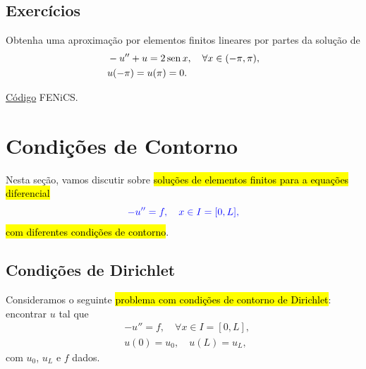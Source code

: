 \subsection{Exercícios}

\begin{exer}\label{exer:dc}
  Obtenha uma aproximação por elementos finitos lineares por partes da solução de
  \begin{align}
    &-u'' + u = 2\operatorname{sen} x,\quad \forall x\in (-\pi, \pi),\\
    &u(-\pi)=u(\pi)=0.
  \end{align}
\end{exer}
\begin{resp}
  \ifispython
  \href{https://github.com/phkonzen/notas/blob/master/src/MetodoElementosFinitos/cap_mef1d/dados/exer_dc/exer_dc.py}{Código} FENiCS.
  \fi
\end{resp}


\section{Condições de Contorno}\label{cap_mef1d_sec_cc}

Nesta seção, vamos discutir sobre \hl{soluções de elementos finitos para a equações diferencial}
\begin{equation}\color{blue}-u'' = f,\quad x\in I=[0, L],
\end{equation}
\hl{com diferentes condições de contorno}.

\subsection{Condições de Dirichlet}

Consideramos o seguinte \hl{problema com condições de contorno de Dirichlet}{\dirichlet}: encontrar $u$ tal que
\begin{align}
  &-u'' = f,\quad \forall x\in I=[0, L],\label{eq:cc_d_eq}\\
  &u(0) = u_0,\quad u(L) = u_L,\label{eq:cc_d_bc}
\end{align}
com $u_0$, $u_L$ e $f$ dados.

